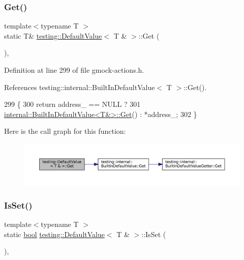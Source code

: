 \subsubsection{\texorpdfstring{Get()}{Get()}}
{\footnotesize\ttfamily template$<$typename T $>$ \\
static T\& \hyperlink{classtesting_1_1DefaultValue}{testing\+::\+Default\+Value}$<$ T \& $>$\+::Get (\begin{DoxyParamCaption}{ }\end{DoxyParamCaption})\hspace{0.3cm}{\ttfamily [inline]}, {\ttfamily [static]}}



Definition at line 299 of file gmock-\/actions.\+h.



References testing\+::internal\+::\+Built\+In\+Default\+Value$<$ T $>$\+::\+Get().


\begin{DoxyCode}
299                   \{
300     \textcolor{keywordflow}{return} address\_ == NULL ?
301         \hyperlink{classtesting_1_1internal_1_1BuiltInDefaultValue_a7e26c1df14a887c8f393b29d6ea162e6}{internal::BuiltInDefaultValue<T&>::Get}() : *address\_;
302   \}
\end{DoxyCode}
Here is the call graph for this function\+:
\nopagebreak
\begin{figure}[H]
\begin{center}
\leavevmode
\includegraphics[width=350pt]{classtesting_1_1DefaultValue_3_01T_01_6_01_4_a1310448dd8c171aecfcbf7c8df5de7bd_cgraph}
\end{center}
\end{figure}
\mbox{\label{classtesting_1_1DefaultValue_3_01T_01_6_01_4_a3e61547c2f0141cc8004385f3a9c817d}} 
\subsubsection{\texorpdfstring{Is\+Set()}{IsSet()}}
{\footnotesize\ttfamily template$<$typename T $>$ \\
static \hyperlink{classbool}{bool} \hyperlink{classtesting_1_1DefaultValue}{testing\+::\+Default\+Value}$<$ T \& $>$\+::Is\+Set (\begin{DoxyParamCaption}{ }\end{DoxyParamCaption})\hspace{0.3cm}{\ttfamily [inline]}, {\ttfamily [static]}}




